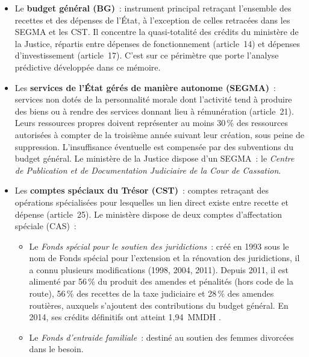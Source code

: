 \begin{itemize}
    \item Le \textbf{budget g\'en\'eral (BG)}~: instrument principal retra\c{c}ant l'ensemble des recettes et des d\'epenses de l'\'Etat, \`a l'exception de celles retrac\'ees dans les SEGMA et les CST. Il concentre la quasi-totalit\'e des cr\'edits du minist\`ere de la Justice, r\'epartis entre d\'epenses de fonctionnement (article~14) et d\'epenses d'investissement (article~17). C'est sur ce p\'erim\`etre que porte l'analyse pr\'edictive d\'evelopp\'ee dans ce m\'emoire.

    \item Les \textbf{services de l'\'Etat g\'er\'es de mani\`ere autonome (SEGMA)}~: services non dot\'es de la personnalit\'e morale dont l'activit\'e tend \`a produire des biens ou \`a rendre des services donnant lieu \`a r\'emun\'eration (article~21). Leurs ressources propres doivent repr\'esenter au moins 30\,\% des ressources autoris\'ees \`a compter de la troisi\`eme ann\'ee suivant leur cr\'eation, sous peine de suppression. L'insuffisance \'eventuelle est compens\'ee par des subventions du budget g\'en\'eral. Le minist\`ere de la Justice dispose d'un SEGMA~: le \textit{Centre de Publication et de Documentation Judiciaire de la Cour de Cassation}.

    \item Les \textbf{comptes sp\'eciaux du Tr\'esor (CST)}~: comptes retra\c{c}ant des op\'erations sp\'ecialis\'ees pour lesquelles un lien direct existe entre recette et d\'epense (article~25). Le minist\`ere dispose de deux comptes d'affectation sp\'eciale (CAS)~:
    \begin{itemize}
        \item Le \textit{Fonds sp\'ecial pour le soutien des juridictions}~: cr\'e\'e en 1993 sous le nom de \og{}Fonds sp\'ecial pour l'extension et la r\'enovation des juridictions\fg{}, il a connu plusieurs modifications (1998, 2004, 2011). Depuis 2011, il est aliment\'e par 56\,\% du produit des amendes et p\'enalit\'es (hors code de la route), 56\,\% des recettes de la taxe judiciaire et 28\,\% des amendes routi\`eres, auxquels s'ajoutent des contributions du budget g\'en\'eral. En 2014, ses cr\'edits d\'efinitifs ont atteint 1,94~MMDH \citep{CourDesComptes2016}.
        \item Le \textit{Fonds d'entraide familiale}~: destin\'e au soutien des femmes divorc\'ees dans le besoin.
    \end{itemize}
\end{itemize}


